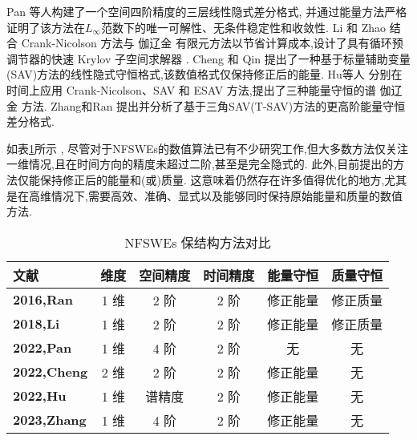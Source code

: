 Pan 等人\cite{panFourthorderDifferenceScheme2022}构建了一个空间四阶精度的三层线性隐式差分格式, 并通过能量方法严格证明了该方法在$L_{\infty}$范数下的唯一可解性、无条件稳定性和收敛性.
Li 和 Zhao \cite{liFastEnergyConserving2018} 结合 Crank-Nicolson 方法与 伽辽金 有限元方法以节省计算成本,设计了具有循环预调节器的快速 Krylov 子空间求解器 . 
Cheng 和 Qin \cite{chengConvergenceEnergyconservingScheme2022} 提出了一种基于标量辅助变量(SAV)方法的线性隐式守恒格式,该数值格式仅保持修正后的能量.
Hu等人 \cite{huEfficientEnergyPreserving2022} 分别在时间上应用 Crank-Nicolson、SAV 和 ESAV 方法,提出了三种能量守恒的谱 伽辽金 方法.
Zhang和Ran \cite{zhangHighorderStructurepreservingDifference2023} 提出并分析了基于三角SAV(T-SAV)方法的更高阶能量守恒差分格式.

如表\ref{tab:NFSWEs}所示 , 尽管对于NFSWEs的数值算法已有不少研究工作,但大多数方法仅关注一维情况,且在时间方向的精度未超过二阶,甚至是完全隐式的.
此外,目前提出的方法仅能保持修正后的能量和(或)质量.
这意味着仍然存在许多值得优化的地方,尤其是在高维情况下,需要高效、准确、显式以及能够同时保持原始能量和质量的数值方法.
\begin{table}[htbp]
    \centering
    \small
    \caption{NFSWEs 保结构方法对比}
        \begin{tabular}{lccccc}
        \toprule
        \textcolor[rgb]{0,0,0}{\textbf{文献}} & \textcolor[rgb]{0,0,0}{\textbf{维度}} & \textcolor[rgb]{0,0,0}{\textbf{空间精度}} & \textcolor[rgb]{0,0,0}{\textbf{时间精度}} & \textcolor[rgb]{0,0,0}{\textbf{能量守恒}} & \textcolor[rgb]{0,0,0}{\textbf{质量守恒}} \\
        \midrule
        \textcolor[rgb]{0,0,0}{\textbf{\cite{ranLinearlyImplicitConservative2016}{2016,Ran}}} & 1 维   & 2 阶   & 2 阶   & 修正能量  & 修正质量 \\
        \midrule
        \textcolor[rgb]{0,0,0}{\textbf{\cite{liFastEnergyConserving2018}{2018,Li}}} & 1 维   & 2 阶   & 2 阶   & 修正能量  & 修正质量 \\
        \midrule
        \textcolor[rgb]{0,0,0}{\textbf{\cite{panFourthorderDifferenceScheme2022}{2022,Pan}}} & 1 维   & 4 阶   & 2 阶   & 无     & 无 \\
        \midrule
        \textcolor[rgb]{0,0,0}{\textbf{\cite{chengConvergenceEnergyconservingScheme2022}{2022,Cheng}}} & 2 维   & 2 阶   & 2 阶   & 修正能量  & 无 \\
        \midrule
        \textcolor[rgb]{0,0,0}{\textbf{\cite{huEfficientEnergyPreserving2022}{2022,Hu}}} & 1 维   & 谱精度   & 2 阶   & 修正能量  & 无 \\
        \midrule
        \textcolor[rgb]{0,0,0}{\textbf{\cite{zhangHighorderStructurepreservingDifference2023}{2023,Zhang}}} & 1 维   & 4 阶   & 2 阶   & 修正能量  & 无 \\
        \bottomrule
        \end{tabular}%
    \label{tab:NFSWEs}%
    \end{table}%
